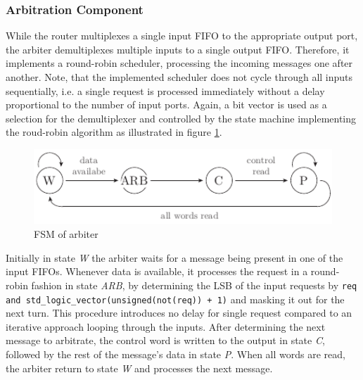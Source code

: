 \subsubsection{Arbitration Component}
While the router multiplexes a single input \ac{FIFO} to the appropriate
output port, the arbiter demultiplexes multiple inputs to a single output
\ac{FIFO}. Therefore, it implements a round-robin scheduler, processing the
incoming messages one after another. Note, that the implemented scheduler does
not cycle through all inputs sequentially, i.e. a single request is processed
immediately without a delay proportional to the number of input ports. Again,
a bit vector is used as a selection for the demultiplexer and controlled by
the state machine implementing the roud-robin algorithm as illustrated in
figure \ref{fig:arbiter_fsm}.
\begin{figure}[tb]
	\centering
	\includegraphics[width=12cm]{../figures/arbiter_fsm}
	\caption{\acs{FSM} of arbiter}
	\label{fig:arbiter_fsm}
\end{figure}
Initially in state \emph{W} the arbiter waits for a message being present in
one of the input \acp{FIFO}. Whenever data is available, it processes the
request in a round-robin fashion in state \emph{ARB}, by determining the
\ac{LSB} of the input requests by
\lstinline{req and std_logic_vector(unsigned(not(req)) + 1)} and masking it
out for the next turn. This procedure introduces no delay for single request
compared to an iterative approach looping through the inputs. After
determining the next message to arbitrate, the control word is written to the
output in state \emph{C}, followed by the rest of the message's data in state
\emph{P}. When all words are read, the arbiter return to state \emph{W} and
processes the next message.

